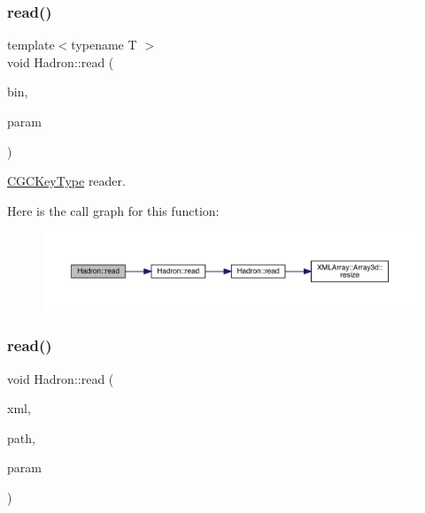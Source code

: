 \subsubsection{\texorpdfstring{read()}{read()}\hspace{0.1cm}{\footnotesize\ttfamily [9/94]}}
{\footnotesize\ttfamily template$<$typename T $>$ \\
void Hadron\+::read (\begin{DoxyParamCaption}\item[{\mbox{\hyperlink{classADATIO_1_1BinaryReader}{Binary\+Reader}} \&}]{bin,  }\item[{\mbox{\hyperlink{structHadron_1_1CGCKeyType}{C\+G\+C\+Key\+Type}}$<$ T $>$ \&}]{param }\end{DoxyParamCaption})\hspace{0.3cm}{\ttfamily [inline]}}



\mbox{\hyperlink{structHadron_1_1CGCKeyType}{C\+G\+C\+Key\+Type}} reader. 

Here is the call graph for this function\+:
\nopagebreak
\begin{figure}[H]
\begin{center}
\leavevmode
\includegraphics[width=350pt]{d1/daf/namespaceHadron_af29a7ca56e3472207899938a2a50babe_cgraph}
\end{center}
\end{figure}
\mbox{\label{namespaceHadron_a4cc74936761dd0dad429189f523b1432}} 
\subsubsection{\texorpdfstring{read()}{read()}\hspace{0.1cm}{\footnotesize\ttfamily [10/94]}}
{\footnotesize\ttfamily void Hadron\+::read (\begin{DoxyParamCaption}\item[{\mbox{\hyperlink{classADATXML_1_1XMLReader}{X\+M\+L\+Reader}} \&}]{xml,  }\item[{const std\+::string \&}]{path,  }\item[{\mbox{\hyperlink{structHadron_1_1KeyHadronSUNNPartIrrep__t}{Key\+Hadron\+S\+U\+N\+N\+Part\+Irrep\+\_\+t}} \&}]{param }\end{DoxyParamCaption})}



